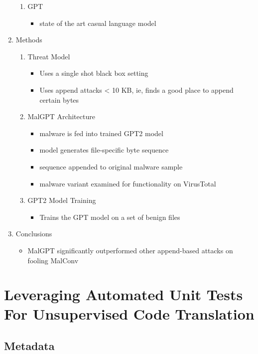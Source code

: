 \documentclass{article}
\begin{document}
\begin{enumerate}
\begin{enumerate}
		\item GPT
		\begin{itemize}
			\item state of the art casual language model
		\end{itemize}
	\end{enumerate}
	\item Methods
	\begin{enumerate}
		\item Threat Model
		\begin{itemize}
			\item Uses a single shot black box setting
			\item Uses append attacks < 10 KB, ie, finds a good place to append certain bytes
		\end{itemize}
		\item MalGPT Architecture
		\begin{itemize}
			\item malware is fed into trained GPT2 model
			\item model generates file-specific byte sequence
			\item sequence appended to original malware sample
			\item malware variant examined for functionality on VirusTotal
		\end{itemize}
		\item GPT2 Model Training
		\begin{itemize}
			\item Trains the GPT model on a set of benign files
		\end{itemize}
	\end{enumerate}
	\item Conclusions
	\begin{itemize}
		\item MalGPT significantly outperformed other append-based attacks on fooling MalConv
	\end{itemize}
\end{enumerate}

\pagebreak


\section*{Leveraging Automated Unit Tests For Unsupervised Code Translation}

\subsection*{Metadata}
\end{document}
